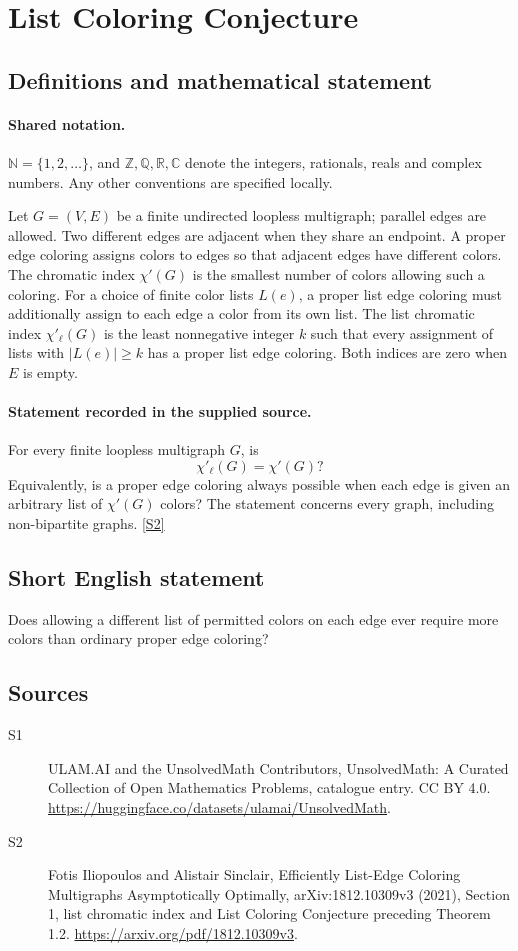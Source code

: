 \documentclass[11pt]{article}
\newcommand{\sref}[2]{\hyperlink{source:#1:#2}{[S#2]}}
\begin{document}
\section{List Coloring Conjecture}\label{statement}

\subsection{Definitions and mathematical statement}

\paragraph{Shared notation.}$\mathbb N=\{1,2,\ldots\}$, and $\mathbb Z,\mathbb Q,\mathbb R,\mathbb C$ denote the integers, rationals, reals and complex numbers. Any other conventions are specified locally.


Let $G=(V,E)$ be a finite undirected loopless multigraph; parallel edges are allowed. Two different edges are adjacent when they share an endpoint. A proper edge coloring assigns colors to edges so that adjacent edges have different colors. The chromatic index $\chi'(G)$ is the smallest number of colors allowing such a coloring. For a choice of finite color lists $L(e)$, a proper list edge coloring must additionally assign to each edge a color from its own list. The list chromatic index $\chi'_{\ell}(G)$ is the least nonnegative integer $k$ such that every assignment of lists with $|L(e)|\ge k$ has a proper list edge coloring. Both indices are zero when $E$ is empty.
\paragraph{Statement recorded in the supplied source.}
For every finite loopless multigraph $G$, is
\[
 \chi'_{\ell}(G)=\chi'(G)?
\]
Equivalently, is a proper edge coloring always possible when each edge is given an arbitrary list of $\chi'(G)$ colors? The statement concerns every graph, including non-bipartite graphs. \sref{statement}{2}
\subsection{Short English statement}
Does allowing a different list of permitted colors on each edge ever require more colors than ordinary proper edge coloring?
\subsection{Sources}
\begin{description}
\item[\hypertarget{source:statement:1}{S1}] ULAM.AI and the UnsolvedMath Contributors, UnsolvedMath: A Curated Collection of Open Mathematics Problems, catalogue entry. CC BY 4.0. \url{https://huggingface.co/datasets/ulamai/UnsolvedMath}.
\item[\hypertarget{source:statement:2}{S2}] Fotis Iliopoulos and Alistair Sinclair, Efficiently List-Edge Coloring Multigraphs Asymptotically Optimally, arXiv:1812.10309v3 (2021), Section 1, list chromatic index and List Coloring Conjecture preceding Theorem 1.2. \url{https://arxiv.org/pdf/1812.10309v3}.
\end{description}
\label{end:statement}
\end{document}
